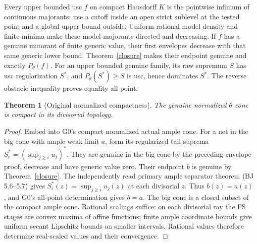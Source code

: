 \documentclass[10pt]{article}
\newtheorem{theorem}{Theorem}[section]
\begin{document}
Every upper bounded usc $f$ on compact Hausdorff $K$ is the pointwise
infimum of continuous majorants: use a cutoff inside an open strict
sublevel at the tested point and a global upper bound outside. Uniform
rational model density and finite minima make these model majorants
directed and decreasing. If $f$ has a genuine minorant of finite generic
value, their first envelopes decrease with that same generic lower bound.
Theorem~\ref{closure} makes their endpoint genuine and exactly $P_\theta(f)$.
For an upper bounded genuine family, its raw supremum $S$ has usc
regularization $S^*$, and $P_\theta(S^*)\geq S$ is usc, hence dominates
$S^*$. The reverse obstacle inequality proves equality all-point.

\begin{theorem}[Original normalized compactness]\label{compact}
The genuine normalized $\theta$ cone is compact in its divisorial topology.
\end{theorem}
\begin{proof}
Embed into G0's compact normalized actual ample cone. For a net in the
big cone with ample weak limit $a$, form its regularized tail suprema
$S_i^*=(\sup_{j\geq i}u_j)^*$. They are genuine in the big cone by
the preceding envelope proof, decrease and have generic value zero.
Their endpoint $b$ is genuine by Theorem~\ref{closure}.
The independently read primary ample separator theorem (BJ 5.6--5.7)
gives $S_i^*(z)=\sup_{j\geq i}u_j(z)$ at each divisorial $z$.
Thus $b(z)=a(z)$, and G0's all-point determination gives $b=a$.
The big cone is a closed subset of the compact ample cone.
Rational scalings suffice: on each divisorial ray the FS stages are
convex maxima of affine functions; finite ample coordinate bounds give
uniform secant Lipschitz bounds on smaller intervals. Rational values
therefore determine real-scaled values and their convergence.
\end{proof}
\end{document}
